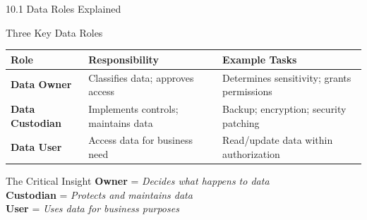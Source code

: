 \documentclass{beamer}
\begin{document}
	\begin{frame}{10.1 Data Roles Explained}
		\begin{block}{Three Key Data Roles}
			\begin{tabular}{|p{2.5cm}|p{4cm}|p{4.5cm}|}
				\hline
				\textbf{Role} & \textbf{Responsibility} & \textbf{Example Tasks} \\
				\hline
				\textbf{Data Owner} & Classifies data; approves access & Determines sensitivity; grants permissions \\
				\hline
				\textbf{Data Custodian} & Implements controls; maintains data & Backup; encryption; security patching \\
				\hline
				\textbf{Data User} & Access data for business need & Read/update data within authorization \\
				\hline
			\end{tabular}
		\end{block}
		
		\begin{alertblock}{The Critical Insight}
			\textbf{Owner} = \textit{Decides what happens to data} \\
			\textbf{Custodian} = \textit{Protects and maintains data} \\
			\textbf{User} = \textit{Uses data for business purposes}
		\end{alertblock}
	\end{frame}
	
\end{document}
